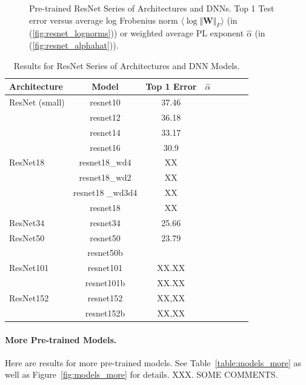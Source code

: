 \begin{figure}[!htb]
{      \label{fig:resnet_alphahat}
   }
   \caption{
      Pre-trained
      ResNet Series of Architectures and DNNs.  
      Top 1 Test error versus
      average log Frobenius norm $\langle\log\Vert\mathbf{W}\Vert_{F}\rangle$ (in (\ref{fig:resnet_lognorms}))
      or
      weighted average PL exponent $\hat{\alpha}$ (in (\ref{fig:resnet_alphahat})).
           }
   \label{fig:resnet}
\end{figure}

\begin{table}[!htb]
\small
\begin{center}
\begin{tabular}{|p{1in}|c|c|c|c|c|c|c|}
\hline
Architecture 
 & Model
 & Top 1 Error & $\hat{\alpha}$ \\
\hline
ResNet (small)  & resnet10 & 37.46 & \\
& resnet12 & 36.18 & \\
& resnet14 & 33.17 & \\
& resnet16 & 30.9 & \\
\hline
ResNet18 & resnet18\_wd4 & XX & \\
& resnet18\_wd2 & XX & \\
& resnet18 \_wd3d4& XX & \\
& resnet18 & XX & \\

\hline
ResNet34 & resnet34 & 25.66 & \\
\hline
ResNet50 & resnet50 & 23.79 & \\
& resnet50b &  & \\

\hline
ResNet101 & resnet101 & XX.XX & \\
& resnet101b & XX.XX & \\
\hline
ResNet152 & resnet152 & XX,XX & \\
& resnet152b & XX,XX & \\
\hline
\end{tabular}
\end{center}
\caption{Results for ResNet Series of Architectures and DNN Models.
        }
\label{table:models_resnet}
\end{table}


\paragraph{More Pre-trained Models.}

Here are results for more pre-trained models.
See
Table~\ref{table:models_more}
as well as 
Figure~\ref{fig:models_more} 
for details.
XXX.  SOME COMMENTS.

